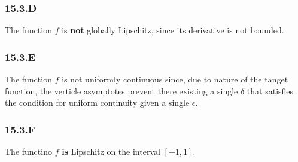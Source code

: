 \subsubsection*{15.3.D}

The function $f$ is \textbf{not} globally Lipschitz, since its derivative is not bounded.

\subsubsection*{15.3.E}

The function $f$ is not uniformly continuous since, due to nature of the tanget function, the verticle asymptotes prevent there existing a single $\delta$ that satisfies the condition for uniform continuity given a single $\epsilon$.


\subsubsection*{15.3.F}
The functino $f$ \textbf{is} Lipschitz on the interval $[-1, 1]$.
